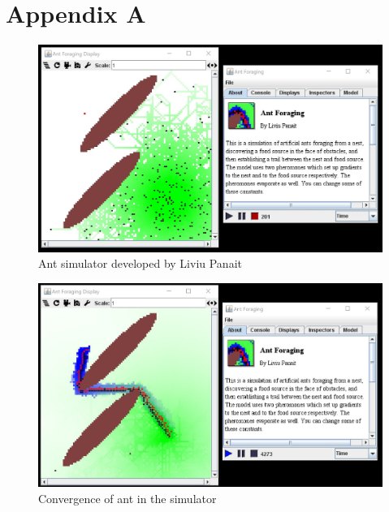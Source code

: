 \documentclass[a4paper, oneside, 11pt]{report}
\begin{document}
\chapter*{Appendix A}
\begin{figure}[htb]
	\begin{center}
	\includegraphics[width=0.95 \columnwidth]{MASON_Ant.jpg}
	\caption{Ant simulator developed by Liviu Panait \citep{Ant_Simulator}}
	\label{fig:MASON_Ant}
	\end{center}
\end{figure}

\begin{figure}[htb]
	\begin{center}
	\includegraphics[width=0.95 \columnwidth]{MASON_Ant_Converged.jpg}
	\caption{Convergence of ant in the simulator \citep{Ant_Simulator}}
	\label{fig:MASON_Ant_Converged}
	\end{center}
\end{figure}
\end{document}
